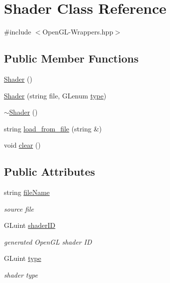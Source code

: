 \hypertarget{classShader}{}\section{Shader Class Reference}
\label{classShader}


{\ttfamily \#include $<$Open\+G\+L-\/\+Wrappers.\+hpp$>$}

\subsection*{Public Member Functions}
\begin{DoxyCompactItemize}
\item 
\mbox{\hyperlink{classShader_a0d654ebaca4e0555197c0724c6d30610}{Shader}} ()
\item 
\mbox{\hyperlink{classShader_a7933b4a0a4d8446c8df9e3c6118a80bf}{Shader}} (string file, G\+Lenum \mbox{\hyperlink{classShader_a855410473ea5bf5ea56e37f6c09543da}{type}})
\item 
\mbox{\hyperlink{classShader_aff01df87e8a102f270b5b135a295e59d}{$\sim$\+Shader}} ()
\item 
string \mbox{\hyperlink{classShader_ad643b976d3d920e95bf6f9f4848e6049}{load\+\_\+from\+\_\+file}} (string \&)
\item 
void \mbox{\hyperlink{classShader_a59d3c7d6dcb0d0801e836b7a11d8095f}{clear}} ()
\end{DoxyCompactItemize}
\subsection*{Public Attributes}
\begin{DoxyCompactItemize}
\item 
string \mbox{\hyperlink{classShader_a32243cdb8d63a829450d0a46686c629b}{file\+Name}}
\begin{DoxyCompactList}\small\item\em source file \end{DoxyCompactList}\item 
G\+Luint \mbox{\hyperlink{classShader_ae94be9c66b18fe70ed6ec0863b416bdf}{shader\+ID}}
\begin{DoxyCompactList}\small\item\em generated Open\+GL shader ID \end{DoxyCompactList}\item 
G\+Luint \mbox{\hyperlink{classShader_a855410473ea5bf5ea56e37f6c09543da}{type}}
\begin{DoxyCompactList}\small\item\em shader type \end{DoxyCompactList}\end{DoxyCompactItemize}


